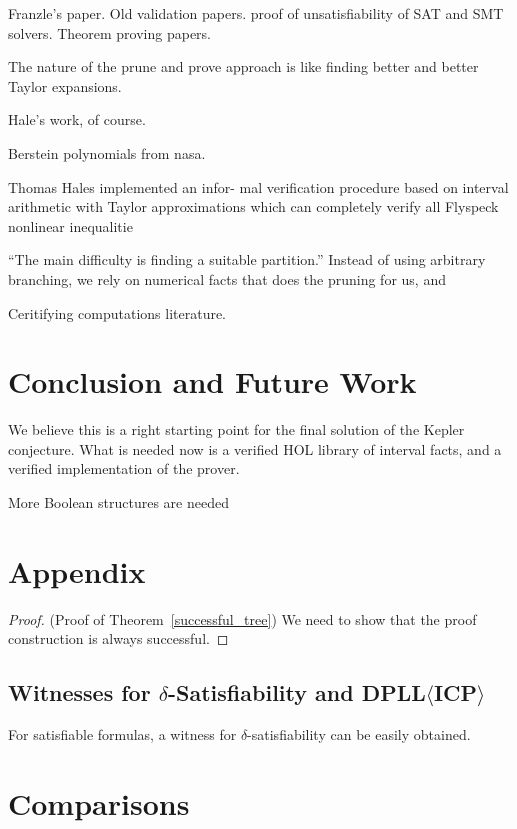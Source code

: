 \documentclass[envcountsect]{llncs}
\begin{document}
Franzle's paper. Old validation papers. proof of unsatisfiability of SAT and
SMT solvers. Theorem proving papers.

The nature of the prune and prove approach is like finding better and better
Taylor expansions.

Hale's work, of course.

Berstein polynomials from nasa.

Thomas Hales implemented an infor-
mal verification procedure based on interval arithmetic with Taylor
approximations which
can completely verify all Flyspeck nonlinear inequalitie

``The main difficulty is finding a suitable partition.'' Instead of using
arbitrary branching, we rely on numerical facts that does the pruning for us,
and

Ceritifying computations literature.


\section{Conclusion and Future Work}

We believe this is a right starting point for the final solution of the Kepler
conjecture. What is needed now is a verified HOL library of interval facts, and
a verified implementation of the prover.

More Boolean structures are needed




\newpage
\section*{Appendix}


\begin{proof}(Proof of Theorem~\ref{successful_tree})
We need to show that the proof construction is always successful.

\end{proof}


\subsection{Witnesses for $\delta$-Satisfiability and
DPLL$\langle$ICP$\rangle$}

For satisfiable formulas, a witness for $\delta$-satisfiability can be
easily obtained.

\section*{Comparisons}
\end{document}
